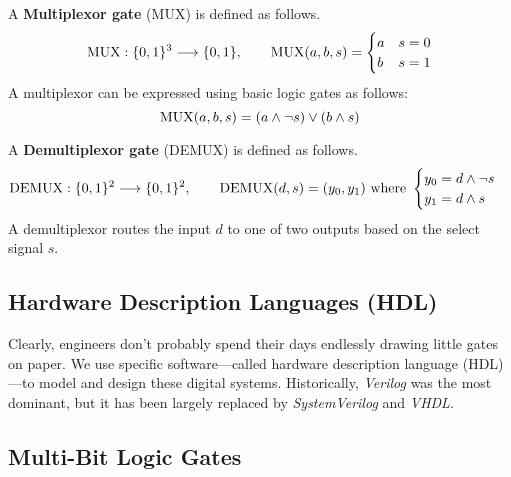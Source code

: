   \begin{definition}
    A \textbf{Multiplexor gate} (MUX) is defined as follows.  
    \begin{equation}
      \MUX: \{0,1\}^3 \longrightarrow \{0,1\}, \qquad 
      \MUX (a, b, s) = \begin{cases}
        a & s = 0 \\
        b & s = 1
      \end{cases}
    \end{equation}
    A multiplexor can be expressed using basic logic gates as follows:
    \begin{equation}
      \MUX(a, b, s) = (a \wedge \neg s) \vee (b \wedge s)
    \end{equation}
  \end{definition}

  \begin{definition}
    A \textbf{Demultiplexor gate} (DEMUX) is defined as follows.  
    \begin{equation}
      \DEMUX: \{0,1\}^2 \longrightarrow \{0,1\}^2, \qquad 
      \DEMUX (d, s) = (y_0, y_1) \text{ where } \begin{cases}
        y_0 = d \wedge \neg s \\
        y_1 = d \wedge s
      \end{cases}
    \end{equation}
    A demultiplexor routes the input $d$ to one of two outputs based on the select signal $s$.
  \end{definition}

  \begin{theorem}
    
  \end{theorem}

\subsection{Hardware Description Languages (HDL)}

  Clearly, engineers don't probably spend their days endlessly drawing little gates on paper. We use specific software---called hardware description language (HDL)---to model and design these digital systems. Historically, \textit{Verilog} was the most dominant, but it has been largely replaced by \textit{SystemVerilog} and \textit{VHDL}. 

\subsection{Multi-Bit Logic Gates}

